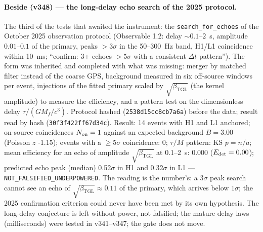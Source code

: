 \documentclass[11pt]{article}
\newcommand{\bTGL}{\beta_{\mathrm{TGL}}}\newcommand{\Msun}{M_{\odot}}\newcommand{\TGL}{\mathrm{TGL}}
\theoremstyle{definition}\newtheorem{deriv}{Derivation}
\begin{document}
\paragraph*{Beside (v348) --- the long-delay echo search of the 2025 protocol.} The third of the tests that awaited the instrument: the \texttt{search\_for\_echoes} of the October 2025 observation protocol (Observable 1.2: delay $\sim0.1$--$2$~s, amplitude $0.01$--$0.1$ of the primary, peaks $>3\sigma$ in the 50--300~Hz band, H1/L1 coincidence within 10~ms; ``confirm: 3+ echoes $>5\sigma$ with a consistent $\Delta t$ pattern''). The form was inherited and completed with what was missing: merger by matched filter instead of the coarse GPS, background measured in six off-source windows per event, injections of the fitted primary scaled by $\sqrt{\bTGL}$ (the kernel amplitude) to measure the efficiency, and a pattern test on the dimensionless delay $\tau/(GM_f/c^3)$. Protocol hashed (\texttt{2538d15cc8cb7a6a}) before the data; result read by hash (\texttt{30f3f422ff67d34c}). Result: 14 events with H1 and L1 anchored; on-source coincidences $N_{\rm on}=1$ against an expected background $B=3.00$ (Poisson $z$ -1.15); events with a $\ge5\sigma$ coincidence: 0; $\tau/M$ pattern: KS $p=n/a$; mean efficiency for an echo of amplitude $\sqrt{\bTGL}$ at 0.1--2~s: 0.000 ($E_{\rm det}=0.00$); predicted echo peak (median) 0.52$\sigma$ in H1 and 0.32$\sigma$ in L1 --- \texttt{NOT\_FALSIFIED\_UNDERPOWERED}. The reading is the number's: a $3\sigma$ peak search cannot see an echo of $\sqrt{\bTGL}\approx0.11$ of the primary, which arrives below $1\sigma$; the 2025 confirmation criterion could never have been met by its own hypothesis. The long-delay conjecture is left without power, not falsified; the mature delay laws (milliseconds) were tested in v341--v347; the gate does not move.
\end{document}
